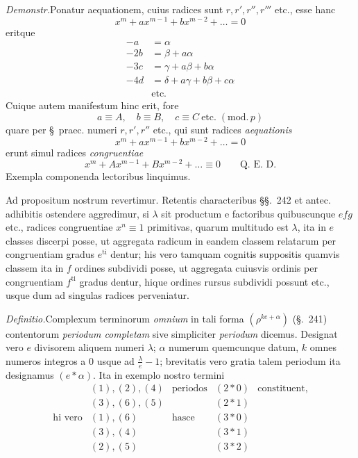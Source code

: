 \emph{Demonstr.}\quad Ponatur aequationem, cuius radices sunt $r,r',r'',r'''$ etc., esse hanc
\[
x^m+ax^{m-1}+bx^{m-2}+\ldots=0
\]
eritque
\[
\begin{aligned}
-a&=\alpha\\
-2b&=\beta+a\alpha\\
-3c&=\gamma+a\beta+b\alpha\\
-4d&=\delta+a\gamma+b\beta+c\alpha\\
&\text{etc.}
\end{aligned}
\]
Cuique autem manifestum hinc erit, fore
\[
a\equiv A,\quad b\equiv B,\quad c\equiv C\ \text{etc.}\;(\mathrm{mod.}\,p)
\]
quare per \S\ praec. numeri $r,r',r''$ etc., qui sunt radices \emph{aequationis}
\[
x^m+ax^{m-1}+bx^{m-2}+\ldots=0
\]
erunt simul radices \emph{congruentiae}
\[
x^m+Ax^{m-1}+Bx^{m-2}+\ldots\equiv0\qquad\text{Q. E. D.}
\]
Exempla componenda lectoribus linquimus.

Ad propositum nostrum revertimur. Retentis characteribus \S\S.\ 242 et antec. adhibitis ostendere aggredimur, si $\lambda$ sit productum e factoribus quibuscunque
$efg$ etc., radices congruentiae $x^n\equiv1$ primitivas, quarum multitudo est $\lambda$, ita in $e$ classes discerpi posse, ut aggregata radicum in eandem classem relatarum per congruentiam gradus $e^{\mathrm{ti}}$ dentur; his vero tamquam cognitis suppositis quamvis classem ita in $f$ ordines subdividi posse, ut aggregata cuiusvis ordinis per congruentiam $f^{\mathrm{ti}}$ gradus dentur, hique ordines rursus subdividi possunt etc., usque dum ad singulas radices perveniatur.

\emph{Definitio.}\quad Complexum terminorum \emph{omnium} in tali forma $(\rho^{ke+\alpha})$ (\S.\ 241) contentorum \emph{periodum completam} sive simpliciter \emph{periodum} dicemus. Designat vero $e$ divisorem aliquem numeri $\lambda$; $\alpha$ numerum quemcunque datum, $k$ omnes numeros integros a $0$ usque ad $\frac{\lambda}{e}-1$; brevitatis vero gratia talem periodum ita designamus $(e\ast\alpha)$. Ita in exemplo nostro termini
\[
\begin{array}{rclcl}
&(1),(2),(4)&\text{periodos}&(2\ast0)&\text{constituent,}\\
&(3),(6),(5)&&(2\ast1)&\\
\text{hi vero}&(1),(6)&\text{hasce}&(3\ast0)&\\
&(3),(4)&&(3\ast1)&\\
&(2),(5)&&(3\ast2)&
\end{array}
\]

